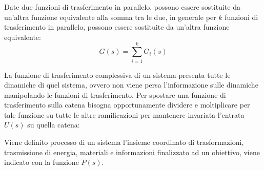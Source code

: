 \documentclass{article}
\numberwithin{equation}{subsection}
\begin{document}
Date due funzioni di trasferimento in parallelo, possono essere sostituite da un'altra funzione equivalente alla somma tra le due, in generale 
per $k$ funzioni di trasferimento in parallelo, possono essere sostituite da un'altra funzione equivalente: 
\begin{equation}
    G(s)=\displaystyle\sum_{i=1}^kG_i(s)
\end{equation}
\begin{figure}[H]%
    \centering
    \qquad
\end{figure}
La funzione di trasferimento complessiva di un sistema presenta tutte le dinamiche di quel sistema, ovvero non viene persa l'informazione sulle 
dinamiche manipolando le funzioni di trasferimento. 
Per spostare una funzione di trasferimento sulla catena bisogna opportunamente dividere e moltiplicare per tale funzione su tutte le altre 
ramificazioni per mantenere invariata l'entrata $U(s)$ su quella catena:

\begin{figure}[H]%
    \centering
    \qquad
\end{figure}

Viene definito processo di un sistema l'insieme coordinato di trasformazioni, trasmissione di energia, materiali e informazioni finalizzato ad un 
obiettivo, viene indicato con la funzione $P(s)$. 
\end{document}
